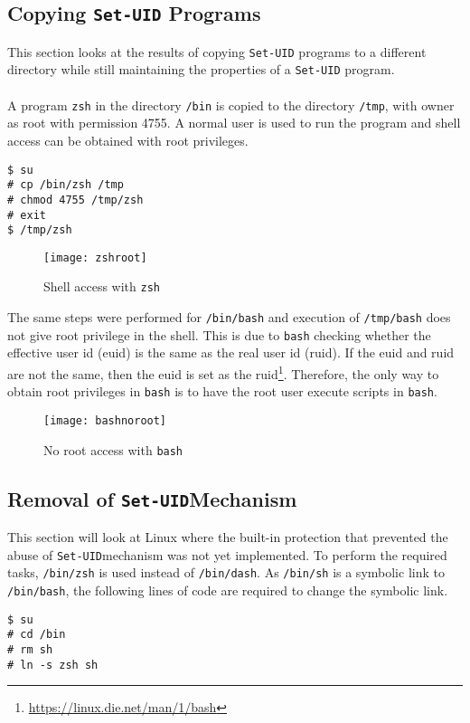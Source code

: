 \documentclass[a4paper,12pt]{article}
\newcommand{\setuid}{\texttt{Set-UID}}
\begin{document}
\subsection{Copying \texttt{Set-UID} Programs}
This section looks at the results of copying \texttt{Set-UID} programs to a different directory while still maintaining the properties of a \texttt{Set-UID} program. \\\\A program \texttt{zsh} in the directory \texttt{/bin} is copied to the directory \texttt{/tmp}, with owner as root with permission 4755. A normal user is used to run the program and shell access can be obtained with root privileges.
\begin{verbatim}
$ su
# cp /bin/zsh /tmp
# chmod 4755 /tmp/zsh
# exit
$ /tmp/zsh
\end{verbatim}
\begin{figure}[H]
	\centering
	\texttt{[image: zshroot]}
	\caption{Shell access with \texttt{zsh}}
	\label{fig:zshroot}
\end{figure}
The same steps were performed for \texttt{/bin/bash} and execution of \texttt{/tmp/bash} does not give root privilege in the shell. This is due to \texttt{bash} checking whether the effective user id (euid) is the same as the real user id (ruid). If the euid and ruid are not the same, then the euid is set as the ruid\footnote{\url{https://linux.die.net/man/1/bash}}. Therefore, the only way to obtain root privileges in \texttt{bash} is to have the root user execute scripts in \texttt{bash}.
\begin{figure}[H]
	\centering
	\texttt{[image: bashnoroot]}
	\caption{No root access with \texttt{bash}}
	\label{fig:bashnoroot}
\end{figure}
\subsection{Removal of \setuid Mechanism}
This section will look at Linux where the built-in protection that prevented the abuse of \setuid mechanism was not yet implemented. To perform the required tasks, \texttt{/bin/zsh} is used instead of \texttt{/bin/dash}. As \texttt{/bin/sh} is a symbolic link to \texttt{/bin/bash}, the following lines of code are required to change the symbolic link.
\begin{verbatim}
$ su 
# cd /bin
# rm sh
# ln -s zsh sh
\end{verbatim}
\end{document}
